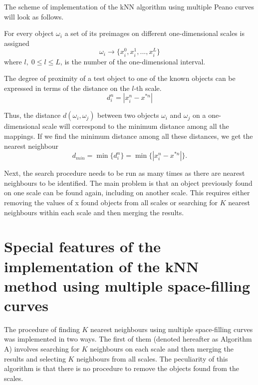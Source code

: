 \documentclass[sensors,article,submit,moreauthors,pdftex]{Definitions/mdpi}
\begin{document}
\begin{paracol}{2}
\linenumbers
\switchcolumn

The scheme of implementation of the kNN algorithm using multiple Peano curves will look as follows.

For every object $\omega_i$ a set of its preimages on different one-dimensional scales is assigned 
\begin{equation}
\omega_i \rightarrow \{ x_i^0, x_i^1, ..., x_i^L \}
\end{equation} 
where $l, \; 0 \leq l \leq L$, is the number of the one-dimensional interval.

The degree of proximity of a test object to one of the known objects can be expressed in terms of the distance on the $l$-th scale.
\begin{equation}
d_i^n = |x_i^n - x^{*n}|
\end{equation} 

Thus, the distance $d(\omega_i,\omega_j)$ between two objects $\omega_i$ and $\omega_j$ on a one-dimensional scale will correspond to the minimum distance among all the mappings. If we find the minimum distance among all these distances, we get the nearest neighbour
\begin{equation}
d_{min} = \min \{ d_i^n \} = \min \{ |x_i^n - x^{*n}| \}.
\end{equation} 

Next, the search procedure needs to be run as many times as there are nearest neighbours to be identified. The main problem is that an object previously found on one scale can be found again, including on another scale. This requires either removing the values of x found objects from all scales or searching for $K$ nearest neighbours within each scale and then merging the results.


\section{Special features of the implementation of the kNN method using multiple space-filling curves}

The procedure of finding $K$ nearest neighbours using multiple space-filling curves was implemented in two ways. The first of them (denoted hereafter as Algorithm A) involves searching for $K$ neighbours on each scale and then merging the results and selecting $K$ neighbours from all scales. The peculiarity of this algorithm is that there is no procedure to remove the objects found from the scales.


\end{paracol}
\end{document}
